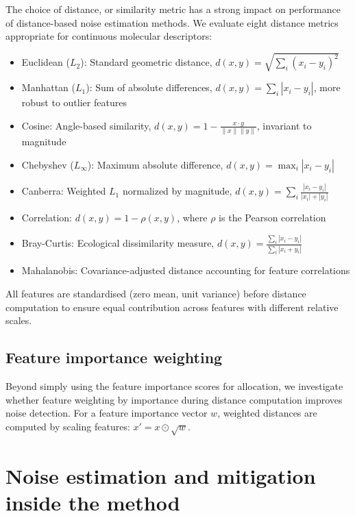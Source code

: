 {%
The choice of distance, or similarity metric has a strong impact on performance of distance-based noise estimation methods. We evaluate eight distance metrics appropriate for continuous molecular descriptors:

\begin{itemize}
    \item Euclidean ($L_2$): Standard geometric distance, $d(x, y) = \sqrt{\sum_i (x_i - y_i)^2}$
    \item Manhattan ($L_1$): Sum of absolute differences, $d(x, y) = \sum_i |x_i - y_i|$, more robust to outlier features
    \item Cosine: Angle-based similarity, $d(x, y) = 1 - \frac{x \cdot y}{\|x\| \|y\|}$, invariant to magnitude
    \item Chebyshev ($L_\infty$): Maximum absolute difference, $d(x, y) = \max_i |x_i - y_i|$
    \item Canberra: Weighted $L_1$ normalized by magnitude, $d(x, y) = \sum_i \frac{|x_i - y_i|}{|x_i| + |y_i|}$
    \item Correlation: $d(x, y) = 1 - \rho(x, y)$, where $\rho$ is the Pearson correlation
    \item Bray-Curtis: Ecological dissimilarity measure, $d(x, y) = \frac{\sum_i |x_i - y_i|}{\sum_i |x_i + y_i|}$
    \item Mahalanobis: Covariance-adjusted distance accounting for feature correlations
\end{itemize}

All features are standardised (zero mean, unit variance) before distance computation to ensure equal contribution across features with different relative scales.

\subsection{Feature importance weighting}

Beyond simply using the feature importance scores for allocation, we investigate whether feature weighting by importance during distance computation improves noise detection. For a feature importance vector $w$, weighted distances are computed by scaling features: $x' = x \odot \sqrt{w}$. 

\section{Noise estimation and mitigation inside the method}

}
